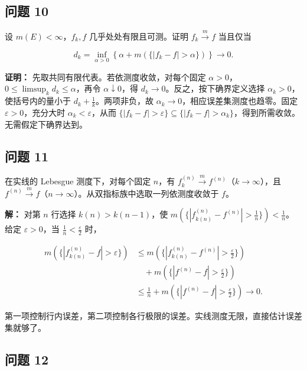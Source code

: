 \documentclass[11pt,a4paper]{article}
\begin{document}
\subsection{问题 10}\label{ux95eeux9898-10}

设 \(m(E)<\infty\)，\(f_k,f\) 几乎处处有限且可测。证明
\(f_k\xrightarrow{m}f\) 当且仅当

\begin{equation*}d_k=\inf_{\alpha>0}\left\{\alpha+m(\{|f_k-f|>\alpha\})\right\}\longrightarrow0.\end{equation*}

\textbf{证明：} 先取共同有限代表。若依测度收敛，对每个固定
\(\alpha>0\)，\(0\le\limsup_k d_k\le\alpha\)，再令
\(\alpha\downarrow0\)，得 \(d_k\to0\)。反之，按下确界定义选择
\(\alpha_k>0\)，使括号内的量小于 \(d_k+\frac1k\)。两项非负，故
\(\alpha_k\to0\)，相应误差集测度也趋零。固定 \(\varepsilon>0\)，充分大时
\(\alpha_k<\varepsilon\)，从而
\(\{|f_k-f|>\varepsilon\}\subseteq\{|f_k-f|>\alpha_k\}\)，得到所需收敛。无需假定下确界达到。

\subsection{问题 11}\label{ux95eeux9898-11}

在实线的 Lebesgue 测度下，对每个固定 \(n\)，有
\(f_k^{(n)}\xrightarrow{m}f^{(n)}\)（\(k\to\infty\)），且
\(f^{(n)}\xrightarrow{m}f\)（\(n\to\infty\)）。从双指标族中选取一列依测度收敛于
\(f\)。

\textbf{解：} 对第 \(n\) 行选择 \(k(n)>k(n-1)\)，使
\(m(\{|f_{k(n)}^{(n)}-f^{(n)}|>\frac1n\})<\frac1n\)。给定
\(\varepsilon>0\)，当 \(\frac1n<\frac\varepsilon2\) 时，

\begin{equation*}
\begin{aligned}
m(\{|f_{k(n)}^{(n)}-f|>\varepsilon\})
&\le m(\{|f_{k(n)}^{(n)}-f^{(n)}|>\tfrac\varepsilon2\})\\
&\quad+m(\{|f^{(n)}-f|>\tfrac\varepsilon2\})\\
&\le\frac1n+m(\{|f^{(n)}-f|>\tfrac\varepsilon2\})\longrightarrow0.
\end{aligned}
\end{equation*}

第一项控制行内误差，第二项控制各行极限的误差。实线测度无限，直接估计误差集就够了。

\subsection{问题 12}\label{ux95eeux9898-12}
\end{document}
